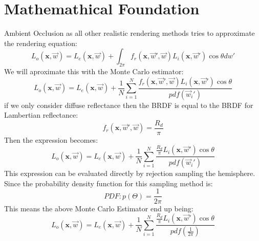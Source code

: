 \section{Mathemathical Foundation}
Ambient Occlusion as all other realistic rendering methods tries to approximate the rendering equation:
\[ 
L_o(\textbf{x},\overrightarrow{w}) = 
L_e(\textbf{x},\overrightarrow{w}) +
\int_{2\pi}
 f_r(\textbf{x},\overrightarrow{w}',\overrightarrow{w} )L_i(\textbf{x},\overrightarrow{w}')\cos\theta dw'
\]
We will aproximate this with the Monte Carlo estimator\cite{Dutre2001}:
\[ 
L_o(\textbf{x},\overrightarrow{w}) = 
L_e(\textbf{x},\overrightarrow{w}) +
\frac{1}{N}
\sum_{i=1}^N \frac{ 
 f_r(\textbf{x},\overrightarrow{w}',\overrightarrow{w} )L_i(\textbf{x},\overrightarrow{w}')\cos\theta
}
{
pdf(\overrightarrow{w}_i')
}
\]
if we only consider diffuse reflectance then the BRDF is equal to the BRDF for Lambertian reflectance:
\[
 f_r(\textbf{x},\overrightarrow{w}',\overrightarrow{w}) = \frac{R_d}{\pi}
\]
Then the expression becomes:
\[ 
L_o(\textbf{x},\overrightarrow{w}) = 
L_e(\textbf{x},\overrightarrow{w}) +
\frac{1}{N}
\sum_{i=1}^N \frac{ 
\frac{R_d}{\pi}L_i(\textbf{x},\overrightarrow{w}')\cos\theta
}
{
pdf(\overrightarrow{w}_i')
}
\]
This expression can be evaluated directly by rejection sampling the hemisphere. Since the probability density function for this sampling method is\cite{Dutre2001}:
\[
PDF : p(\Theta) = \frac{1}{2\pi}
\]
This means the above Monte Carlo Estimator end up being:
\[ 
L_o(\textbf{x},\overrightarrow{w}) = 
L_e(\textbf{x},\overrightarrow{w}) +
\frac{1}{N}
\sum_{i=1}^N \frac{ 
\frac{R_d}{\pi}L_i(\textbf{x},\overrightarrow{w}')\cos\theta
}
{
pdf(\frac{1}{2\pi})
}
\]

